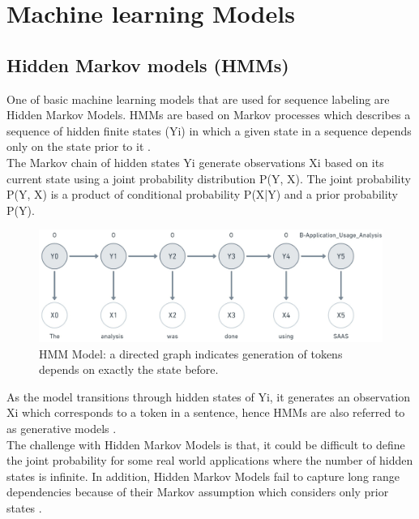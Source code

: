 \section{Machine learning Models}
\label{sec:chapter05:MLModels}

\subsection{Hidden Markov models (\ac{HMM}s)}
\label{sec:chapter05:MLModels:HMMS}

One of basic machine learning models that are used for sequence labeling are Hidden Markov Models. HMMs are based on Markov processes which describes a sequence of hidden finite states (Yi) in which a given state in a sequence depends only on the state prior to it \citep{aggarwal2018machine, gagniuc2017markov}. \\

The Markov chain of hidden states Yi generate observations Xi based on its current state using a joint probability distribution P(Y, X). The joint probability P(Y, X) is a product of conditional probability  P(X|Y) and a prior probability P(Y).  \\

\begin{figure}[htbp]
	\centering
	\includegraphics[width=.75\textwidth]{4.graphics/figures/ch_5/HMM}
	\caption{\ac{HMM} Model: a directed graph indicates generation of tokens depends on exactly the state before.}
	\label{fig:chapter03:setup}
\end{figure}

As the model transitions through hidden states of Yi, it generates an observation Xi which corresponds to a token in a sentence, hence HMMs are also referred to as generative models \citep{aggarwal2018machine}. \\

The challenge with Hidden Markov Models is that, it could be difficult to define the joint probability for some real world applications where the number of hidden states is infinite. In addition, Hidden Markov Models fail to capture long range dependencies because of their Markov assumption which considers only prior states \citep{bulla2006application, wallach2004conditional}.
 
